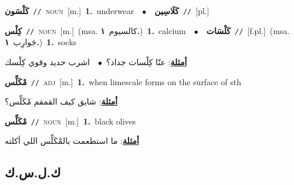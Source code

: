 \documentclass[10pt,a4paper,twoside]{article} %
\begin{document}
\begin{multicols}{2}
{\setlength\topsep{0pt}\textbf{\foreignlanguage{arabic}{كَلْسَون}}\ {\color{gray}\texttt{//}\color{black}}\ \textsc{noun}\ [m.]\ \textbf{1.}~underwear\ \ $\bullet$\ \ \setlength\topsep{0pt}\textbf{\foreignlanguage{arabic}{كَلَاسِين}}\ {\color{gray}\texttt{//}\color{black}}\ [pl.]\ } \vspace{2mm}

{\setlength\topsep{0pt}\textbf{\foreignlanguage{arabic}{كِلْس}}\ {\color{gray}\texttt{//}\color{black}}\ \textsc{noun}\ [m.]\ \color{gray}(msa. \foreignlanguage{arabic}{كالسيوم}~\foreignlanguage{arabic}{\textbf{١.}})\color{black}\ \textbf{1.}~calcium\ \ $\bullet$\ \ \setlength\topsep{0pt}\textbf{\foreignlanguage{arabic}{كَلْسَات}}\ {\color{gray}\texttt{//}\color{black}}\ [f.pl.]\ \color{gray}(msa. \foreignlanguage{arabic}{جَوارِب}~\foreignlanguage{arabic}{\textbf{١.}})\color{black}\ \textbf{1.}~socks\  \begin{flushright}\color{gray}\foreignlanguage{arabic}{\textbf{\underline{\foreignlanguage{arabic}{أمثلة}}}: عنّا كِلْسات جداد؟\ $\bullet$\ \  اشرب حديد وقوي كِلْسك}\end{flushright}\color{black}} \vspace{2mm}

{\setlength\topsep{0pt}\textbf{\foreignlanguage{arabic}{مْكَلِّس}}\ {\color{gray}\texttt{//}\color{black}}\ \textsc{adj}\ [m.]\ \textbf{1.}~when limescale forms on the surface of sth\  \begin{flushright}\color{gray}\foreignlanguage{arabic}{\textbf{\underline{\foreignlanguage{arabic}{أمثلة}}}: شايق كيف القمقم مْكَلِّس؟}\end{flushright}\color{black}} \vspace{2mm}

{\setlength\topsep{0pt}\textbf{\foreignlanguage{arabic}{مْكَلِّس}}\ {\color{gray}\texttt{//}\color{black}}\ \textsc{noun}\ [m.]\ \textbf{1.}~black olives\  \begin{flushright}\color{gray}\foreignlanguage{arabic}{\textbf{\underline{\foreignlanguage{arabic}{أمثلة}}}: ما استطعمت بالمْكَلِّس اللي أكلته}\end{flushright}\color{black}} \vspace{2mm}

\vspace{-3mm}
\subsection*{\color{blue}\foreignlanguage{arabic}{ك.ل.س.ك}\color{blue}{ (ntws)}} 


\end{multicols}
\end{document}
